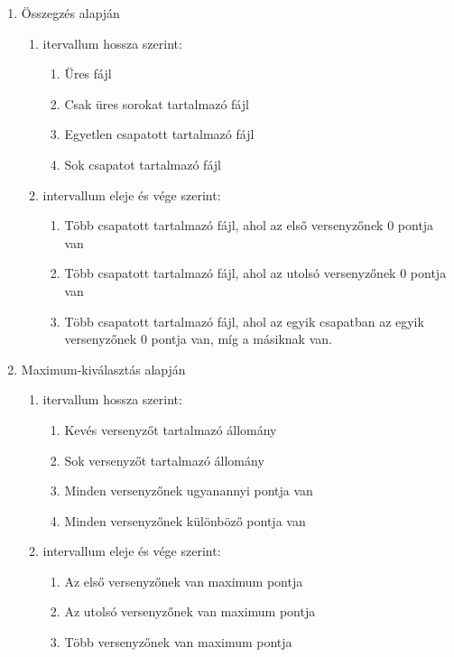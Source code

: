 \documentclass[a4paper]{article}
\begin{document}
	\begin{enumerate}
		\item Összegzés alapján
		\begin{enumerate}
			\item itervallum hossza szerint:
			\begin{enumerate}
				\item Üres fájl
				\item Csak üres sorokat tartalmazó fájl
				\item Egyetlen csapatott tartalmazó fájl
				\item Sok csapatot tartalmazó fájl
			\end{enumerate}
			\item intervallum eleje és vége szerint:
			\begin{enumerate}
				\item Több csapatott tartalmazó fájl, ahol az első versenyzőnek 0 pontja van
				\item Több csapatott tartalmazó fájl, ahol az utolsó versenyzőnek 0 pontja van
				\item Több csapatott tartalmazó fájl, ahol az egyik csapatban az egyik versenyzőnek 0 pontja van, míg a másiknak van.				
			\end{enumerate}
		\end{enumerate}
		\item Maximum-kiválasztás alapján
		\begin{enumerate}
			\item itervallum hossza szerint:
			\begin{enumerate}
				\item Kevés versenyzőt tartalmazó állomány
				\item Sok versenyzőt tartalmazó állomány
				\item Minden versenyzőnek ugyanannyi pontja van
				\item Minden versenyzőnek különböző pontja van
			\end{enumerate}
			\item intervallum eleje és vége szerint:
			\begin{enumerate}
				\item Az első versenyzőnek van maximum pontja
				\item Az utolsó versenyzőnek van maximum pontja
				\item Több versenyzőnek van maximum pontja				
			\end{enumerate}
		\end{enumerate}		
	\end{enumerate}
		
			
			
			
		
	
		
\end{document}
